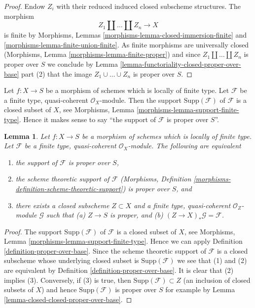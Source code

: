 \documentclass[10pt,a4paper]{amsart}
\theoremstyle{plain}
\newtheorem{lemma}[subsection]{Lemma}
\theoremstyle{definition}
\theoremstyle{remark}
\numberwithin{equation}{subsection}
\begin{document}
\begin{proof}
Endow $Z_i$ with their reduced induced closed subscheme structures.
The morphism
$$
Z_1 \amalg \ldots \amalg Z_n \longrightarrow X
$$
is finite by Morphisms, Lemmas
\ref{morphisms-lemma-closed-immersion-finite} and
\ref{morphisms-lemma-finite-union-finite}.
As finite morphisms are universally closed
(Morphisms, Lemma \ref{morphisms-lemma-finite-proper})
and since $Z_1 \amalg \ldots \amalg Z_n$ is proper over $S$
we conclude by
Lemma \ref{lemma-functoriality-closed-proper-over-base} part (2)
that the image $Z_1 \cup \ldots \cup Z_n$ is proper over $S$.
\end{proof}

\noindent
Let $f : X \to S$ be a morphism of schemes which is locally
of finite type. Let $\mathcal{F}$ be a finite type, quasi-coherent
$\mathcal{O}_X$-module. Then the support $\text{Supp}(\mathcal{F})$
of $\mathcal{F}$ is a closed subset of $X$, see
Morphisms, Lemma \ref{morphisms-lemma-support-finite-type}.
Hence it makes sense to say
``the support of $\mathcal{F}$ is proper over $S$''.

\begin{lemma}
\label{lemma-module-support-proper-over-base}
Let $f : X \to S$ be a morphism of schemes which is locally
of finite type. Let $\mathcal{F}$ be a finite type, quasi-coherent
$\mathcal{O}_X$-module. The following are equivalent
\begin{enumerate}
\item the support of $\mathcal{F}$ is proper over $S$,
\item the scheme theoretic support of $\mathcal{F}$
(Morphisms, Definition \ref{morphisms-definition-scheme-theoretic-support})
is proper over $S$, and
\item there exists a closed subscheme $Z \subset X$ and
a finite type, quasi-coherent $\mathcal{O}_Z$-module
$\mathcal{G}$ such that (a) $Z \to S$ is proper, and (b)
$(Z \to X)_*\mathcal{G} = \mathcal{F}$.
\end{enumerate}
\end{lemma}

\begin{proof}
The support $\text{Supp}(\mathcal{F})$ of $\mathcal{F}$ is a closed subset
of $X$, see Morphisms, Lemma \ref{morphisms-lemma-support-finite-type}.
Hence we can apply Definition \ref{definition-proper-over-base}.
Since the scheme theoretic support of $\mathcal{F}$ is a closed
subscheme whose underlying closed subset is $\text{Supp}(\mathcal{F})$
we see that (1) and (2) are equivalent by
Definition \ref{definition-proper-over-base}.
It is clear that (2) implies (3).
Conversely, if (3) is true, then
$\text{Supp}(\mathcal{F}) \subset Z$
(an inclusion of closed subsets of $X$)
and hence $\text{Supp}(\mathcal{F})$
is proper over $S$ for example by
Lemma \ref{lemma-closed-closed-proper-over-base}.
\end{proof}
\end{document}
